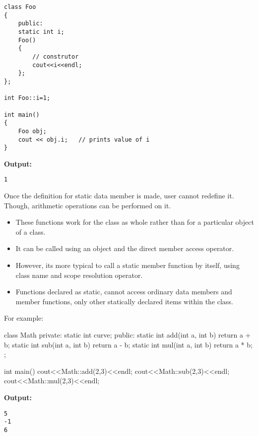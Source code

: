 \begin{verbatim}
class Foo
{
    public:
    static int i;
    Foo()
    {
        // construtor
        cout<<i<<endl;
    };
};

int Foo::i=1;

int main()
{
    Foo obj;
    cout << obj.i;   // prints value of i
}
\end{verbatim}

\textbf{Output:}
\begin{verbatim}
1
\end{verbatim}

Once the definition for static data member is made, user cannot redefine it. Though, arithmetic operations can be performed on it.


\begin{itemize}
\tightlist
    \item These functions work for the class as whole rather than for a particular object of a class.
    \item It can be called using an object and the direct member access  operator.
    \item However, its more typical to call a static member function by itself, using class name and scope resolution \btic{::} operator.
    \item Functions declared as static, cannot access ordinary data members and member functions, only other statically declared items within the class. 
\end{itemize}

For example:

class Math{
private:
    static int curve;
public:
    static int add(int a, int b){
        return a + b;
    }
    static int sub(int a, int b){
        return a - b;
    }
    static int mul(int a, int b){
        return a * b;
    }
};

int main(){
    cout<<Math::add(2,3)<<endl;
    cout<<Math::sub(2,3)<<endl;
    cout<<Math::mul(2,3)<<endl;
}

\textbf{Output:}
\begin{verbatim}
5
-1
6
\end{verbatim}
